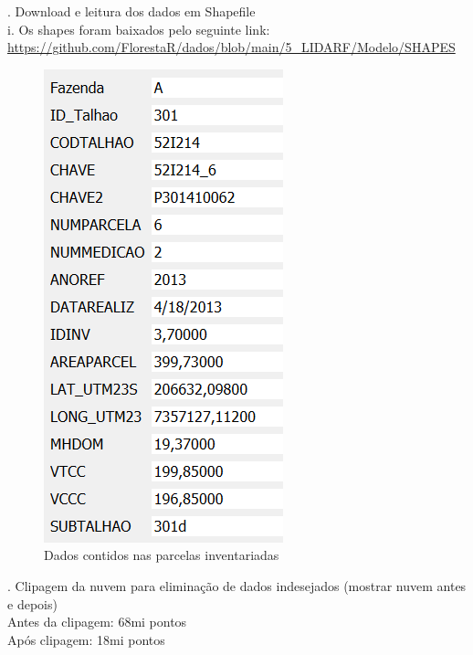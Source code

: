 \documentclass[
]{article}
\begin{document}

. Download e leitura dos dados em Shapefile\\
i. Os shapes foram baixados pelo seguinte link:
\url{https://github.com/FlorestaR/dados/blob/main/5_LIDARF/Modelo/SHAPES}

\begin{figure}

{\centering \includegraphics[width=0.5\linewidth]{IMAGES/atributosinventariadas} 

}

\caption{Dados contidos nas parcelas inventariadas}\label{fig:unnamed-chunk-12}
\end{figure}


. Clipagem da nuvem para eliminação de dados indesejados (mostrar nuvem
antes e depois)\\
Antes da clipagem: 68mi pontos\\
Após clipagem: 18mi pontos
\end{document}
